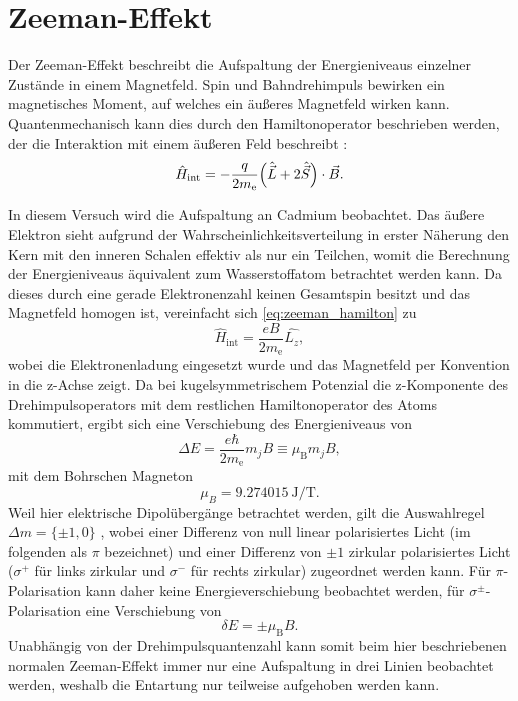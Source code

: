 \section{Zeeman-Effekt}\label{sec:zeeman}
Der Zeeman-Effekt beschreibt die Aufspaltung der Energieniveaus einzelner Zustände 
in einem Magnetfeld. Spin und Bahndrehimpuls bewirken ein magnetisches Moment, auf welches 
ein äußeres Magnetfeld wirken kann. Quantenmechanisch kann dies durch den Hamiltonoperator 
beschrieben werden, der die Interaktion mit einem äußeren Feld beschreibt \cite{Sakurai}:
\begin{equation}
    \hat H_\mathrm{int} = -\frac{q}{2m_\mathrm e}\qty(\hat{\vec L} + 2\hat{\vec S})\cdot \vec B.
    \label{eq:zeeman_hamilton}
\end{equation}

In diesem Versuch wird die Aufspaltung an Cadmium beobachtet. Das äußere Elektron sieht 
aufgrund der Wahrscheinlichkeitsverteilung in erster Näherung den Kern mit den inneren 
Schalen effektiv als nur ein Teilchen, womit die Berechnung der Energieniveaus 
äquivalent zum Wasserstoffatom betrachtet werden kann. Da dieses durch eine gerade 
Elektronenzahl keinen Gesamtspin 
besitzt und das Magnetfeld homogen ist, vereinfacht sich \cref{eq:zeeman_hamilton} zu 
\begin{equation*}
    \hat H_\mathrm{int} = \frac{eB}{2m_\mathrm e}\hat{L_z},
\end{equation*}
wobei die Elektronenladung eingesetzt wurde und das Magnetfeld per Konvention in die z-Achse zeigt.
Da bei kugelsymmetrischem Potenzial die z-Komponente des Drehimpulsoperators mit dem restlichen Hamiltonoperator
des Atoms kommutiert, ergibt sich eine Verschiebung des Energieniveaus von
\begin{equation*}
    \Delta E = \frac{e\hbar}{2m_\mathrm e}m_jB \equiv \mu_\mathrm B m_j B ,
    \label{eq:energy_zeeman}
\end{equation*}
mit dem Bohrschen Magneton \cite{Demtröder:829119}
\begin{equation}
    \mu_B = \SI{9.274015}{\joule\per\tesla}.
    \label{eq:magneton}
\end{equation}
Weil hier elektrische Dipolübergänge betrachtet werden, gilt die Auswahlregel 
$\Delta m = \{\pm 1, 0\}$ \cite{Demtröder:829119}, wobei einer Differenz 
von null linear polarisiertes Licht (im folgenden als $\pi$ bezeichnet) und einer Differenz von $\pm 1$
zirkular polarisiertes Licht ($\sigma^+$ für links zirkular und $\sigma^-$ für rechts zirkular) 
zugeordnet werden kann.
Für $\pi$-Polarisation kann daher keine Energieverschiebung beobachtet werden, für 
$\sigma^\pm$-Polarisation eine Verschiebung von 
\begin{equation}
    \delta E = \pm \mu_\mathrm B B
    \label{eq:normal_zeeman}.
\end{equation}
Unabhängig von der Drehimpulsquantenzahl kann somit beim hier beschriebenen 
normalen Zeeman-Effekt immer nur eine Aufspaltung in drei Linien beobachtet werden,
weshalb die Entartung nur teilweise aufgehoben werden kann.

